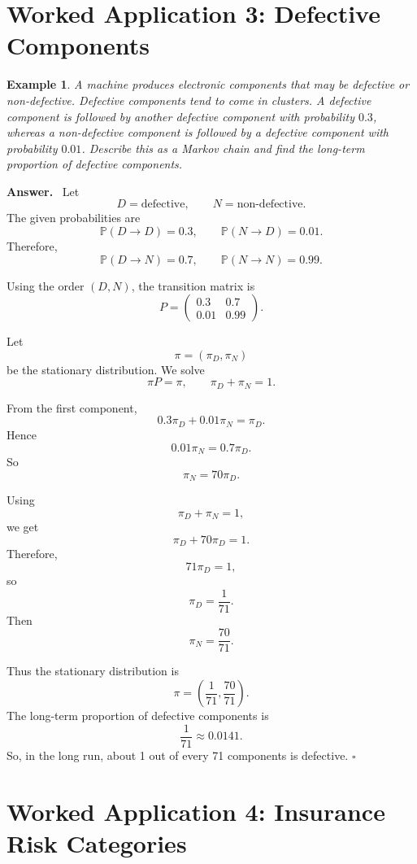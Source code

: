\documentclass[12pt,a4paper]{article}
\theoremstyle{lecturestyle}
\newtheorem{example}{Example}
\newenvironment{answer}
{\par\textbf{Answer.}\ }
{\hfill$\square$\par}
\newcommand{\Prob}{\mathbb{P}}
\begin{document}
\section{Worked Application 3: Defective Components}

\begin{example}
A machine produces electronic components that may be defective or non-defective. Defective components tend to come in clusters. A defective component is followed by another defective component with probability $0.3$, whereas a non-defective component is followed by a defective component with probability $0.01$. Describe this as a Markov chain and find the long-term proportion of defective components.
\end{example}

\begin{answer}
Let
\[
D=\text{defective},\qquad N=\text{non-defective}.
\]
The given probabilities are
\[
\Prob(D\to D)=0.3,
\qquad
\Prob(N\to D)=0.01.
\]
Therefore,
\[
\Prob(D\to N)=0.7,
\qquad
\Prob(N\to N)=0.99.
\]

Using the order $(D,N)$, the transition matrix is
\[
P=
\begin{pmatrix}
0.3 & 0.7\\
0.01 & 0.99
\end{pmatrix}.
\]

Let
\[
\pi=(\pi_D,\pi_N)
\]
be the stationary distribution. We solve
\[
\pi P=\pi,
\qquad
\pi_D+\pi_N=1.
\]

From the first component,
\[
0.3\pi_D+0.01\pi_N=\pi_D.
\]
Hence
\[
0.01\pi_N=0.7\pi_D.
\]
So
\[
\pi_N=70\pi_D.
\]

Using
\[
\pi_D+\pi_N=1,
\]
we get
\[
\pi_D+70\pi_D=1.
\]
Therefore,
\[
71\pi_D=1,
\]
so
\[
\pi_D=\frac1{71}.
\]
Then
\[
\pi_N=\frac{70}{71}.
\]

Thus the stationary distribution is
\[
\boxed{\pi=\left(\frac1{71},\frac{70}{71}\right).}
\]
The long-term proportion of defective components is
\[
\boxed{\frac1{71}\approx 0.0141.}
\]
So, in the long run, about 1 out of every 71 components is defective.
\end{answer}

\section{Worked Application 4: Insurance Risk Categories}
\end{document}

